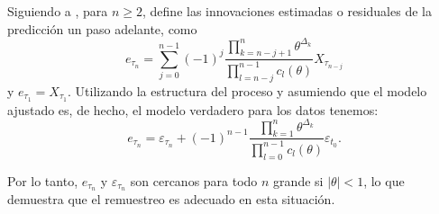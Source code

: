Siguiendo a \cite{bose1990bootstrap}, para $n \geq 2$, define las innovaciones estimadas o residuales de la predicción un paso 
adelante, como
$$
e_{\tau_n}=\sum_{j=0}^{n-1}(-1)^j \frac{\prod_{k=n-j+1}^n \theta^{\Delta_k}}{\prod_{l=n-j}^{n-1} c_l(\theta)} X_{\tau_{n-j}}
$$
y $e_{\tau_1}=X_{\tau_1}$. Utilizando la estructura del proceso y asumiendo que el modelo ajustado es, de hecho, el modelo verdadero
 para los datos tenemos:
$$
e_{\tau_n}=\varepsilon_{\tau_n}+(-1)^{n-1} \frac{\prod_{k=1}^n \theta^{\Delta_k}}{\prod_{l=0}^{n-1} c_l(\theta)} \varepsilon_{t_0} .
$$

Por lo tanto, $e_{\tau_n}$ y $\varepsilon_{\tau_n}$ son cercanos para todo $n$ grande si $|\theta|<1$, lo que demuestra que el remuestreo es adecuado en esta situación.


